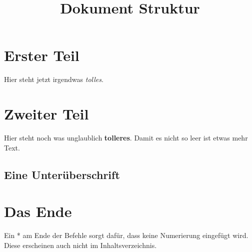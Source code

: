 \documentclass[a4paper]{scrartcl}
\title{Dokument Struktur}
\author{}
\date{}
\begin{document}
\maketitle

\tableofcontents

\section{Erster Teil}
Hier steht jetzt irgendwas \textit{tolles}.

\section{Zweiter Teil}
Hier steht noch was unglaublich \textbf{tolleres}. Damit es nicht so leer ist etwas mehr Text.

\lipsum[1]

\subsection{Eine Unterüberschrift}
\lipsum[2]

\section*{Das Ende}
Ein * am Ende der Befehle sorgt dafür, dass keine Numerierung eingefügt wird.
Diese erscheinen auch nicht im Inhaltsverzeichnis.
\end{document}
